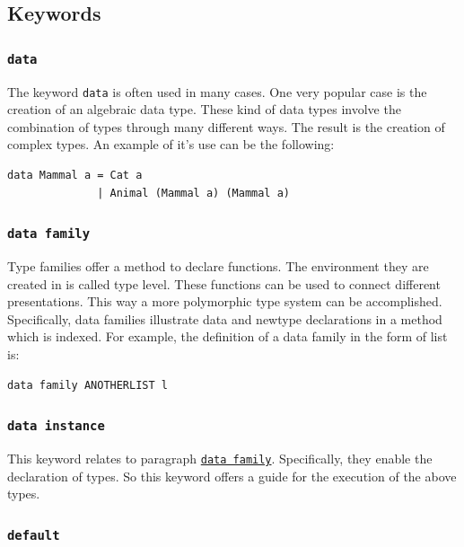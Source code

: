 \documentclass[a4paper, titlepage, twoside]{article}
\begin{document}
\subsection{Keywords}
\label{sec:org9f7f224}

\subsubsection{\texttt{data}}
\label{sec:org4b4fd6c}

The keyword \texttt{data} is often used in many cases. One very popular case is the creation of an algebraic data type. These kind of data types involve the combination of types through many different ways. The result is the creation of complex types. An example of it's use can be the following:

\begin{verbatim}
data Mammal a = Cat a
              | Animal (Mammal a) (Mammal a)
\end{verbatim}

\subsubsection{\texttt{data family}}
\label{sec:org8082c89}

Type families offer a method to declare functions. The environment they are created in is called type level. These functions can be used to connect different presentations. This way a more polymorphic type system can be accomplished. Specifically, data families illustrate data and newtype declarations in a method which is indexed. For example, the definition of a data family in the form of list is:

\begin{verbatim}
data family ANOTHERLIST l
\end{verbatim}

\subsubsection{\texttt{data instance}}
\label{sec:orgaef5232}

This keyword relates to paragraph \hyperref[sec:org8082c89]{\texttt{data family}}. Specifically, they enable the declaration of types. So this keyword offers a guide for the execution of the above types.

\subsubsection{\texttt{default}}
\label{sec:org273dba2}
\end{document}
